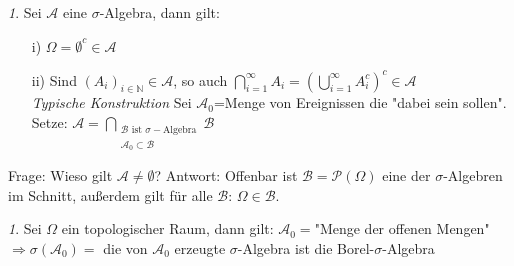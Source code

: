\documentclass[10pt,a4paper]{report}
\numberwithin{equation}{section}
\numberwithin{figure}{section}
\theoremstyle{plain}
\theoremstyle{definition}
\theoremstyle{remark}
\newtheorem{rem}[thm]{\protect\remarkname}
\theoremstyle{plain}
\providecommand{\remarkname}{Bemerkung}
\newcommand{\1}{ \mathbb{1} } %
\begin{document}
\begin{rem}
  Sei $\mathcal{A}$ eine $\sigma$-Algebra, dann gilt:
  \begin{itemize}
  \item[i)] $\Omega=\emptyset^c \in \mathcal{A}$
  \item[ii)] Sind $(A_i)_{i \in \mathbb{N}} \in \mathcal{A}$, so auch $\bigcap\limits_{i=1}^\infty A_i=\left(\bigcup\limits_{i=1}^\infty A_i^c\right)^c \in \mathcal{A}$\\
    \textit{Typische Konstruktion} Sei $\mathcal{A}_0$=Menge von
    Ereignissen die "dabei sein sollen". Setze:
    $\mathcal{A}=\bigcap\limits_{\substack{\mathcal{B} \text{ ist }
        \sigma-\text{Algebra}\\ \mathcal{A}_0\subset
        \mathcal{B}}}\mathcal{B}$
  \end{itemize}

\end{rem}
Frage: Wieso gilt $\mathcal{A}\neq \emptyset$? Antwort: Offenbar ist $\mathcal{B}=\mathcal{P}(\Omega)$ eine der $\sigma$-Algebren im Schnitt, außerdem gilt für alle $\mathcal{B}$: $\Omega \in \mathcal{B}$.
\begin{rem}
  Sei $\Omega$ ein topologischer Raum, dann gilt:
  $\mathcal{A}_0=$"Menge der offenen Mengen"
  $\Rightarrow \sigma(\mathcal{A}_0)=$ die von $\mathcal{A}_0$ erzeugte $\sigma$-Algebra ist die Borel-$\sigma$-Algebra
\end{rem}

\end{document}
